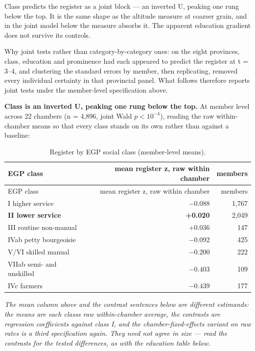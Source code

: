 Class predicts the register as a joint block --- an inverted U, peaking one rung below the top. It is the same shape as the altitude measure at coarser grain, and in the joint model below the measure absorbs it. The apparent education gradient does not survive its controls.

Why joint tests rather than category-by-category ones: on the eight provinces, class, education and prominence had each appeared to predict the register at t = 3--4, and clustering the standard errors by member, then replicating, removed every individual certainty in that provincial panel. What follows therefore reports joint tests under the member-level specification above.

\textbf{Class is an inverted U, peaking one rung below the top.} At member level
across 22 chambers (n = 4,896, joint Wald \textbf{\(p < 10^{-4}\)}), reading the raw
within-chamber means so that every class stands on its own rather than against
a baseline:

\begingroup\small
\begin{longtable}[]{@{}lrr@{}}
\caption{Register by EGP social class (member-level means).}\label{tab:egp}\\
\toprule\noalign{}
EGP class & mean register z, raw within chamber & members \\
\midrule\noalign{}
\endfirsthead
\toprule\noalign{}
EGP class & mean register z, raw within chamber & members \\
\midrule\noalign{}
\endhead
\bottomrule\noalign{}
\endlastfoot
I higher service & \(-0.088\) & 1,767 \\
\textbf{II lower service} & \textbf{+0.020} & 2,049 \\
III routine non-manual & +0.036 & 147 \\
IVab petty bourgeoisie & \(-0.092\) & 425 \\
V/VI skilled manual & \(-0.200\) & 222 \\
VIIab semi- and unskilled & \(-0.403\) & 109 \\
IVc farmers & \(-0.439\) & 177 \\
\end{longtable}
\endgroup

\emph{The mean column above and the contrast sentences below are different
estimands: the means are each class\textquotesingle s raw within-chamber average, the contrasts
are regression coefficients against class I, and the chamber-fixed-effects
variant on raw rates is a third specification again. They need not agree in
size --- read the contrasts for the tested differences, as with the education
table below.}

